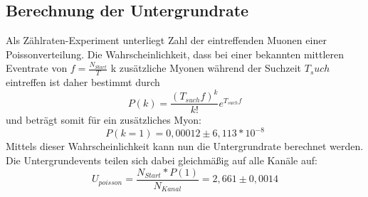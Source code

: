 \begin{tabular}
\begin{tabular}
\begin{tabular}
\subsection{Berechnung der Untergrundrate}
Als Zählraten-Experiment unterliegt Zahl der eintreffenden Muonen einer Poissonverteilung. Die Wahrscheinlichkeit, dass bei einer bekannten mittleren Eventrate von $f=\frac{N_{Start}}{T}$ k zusätzliche Myonen während der Suchzeit $T_such$ eintreffen ist daher bestimmt durch
\begin{equation}
P(k)=\frac{(T_{such}f)^k}{k!}e^{T_{such}f}
\end{equation}
und beträgt somit für ein zusätzliches Myon:
\begin{equation}
P(k=1)=0,00012\pm6,113*10^{-8}
\end{equation}
Mittels dieser Wahrscheinlichkeit kann nun die Untergrundrate berechnet werden. Die Untergrundevents teilen sich dabei gleichmäßig auf alle Kanäle auf:
\begin{equation}
U_{poisson}=\frac{N_{Start}*P(1)}{N_{Kanal}}=2,661\pm0,0014
\end{equation}

\end{tabular}
\end{tabular}
\end{tabular}
